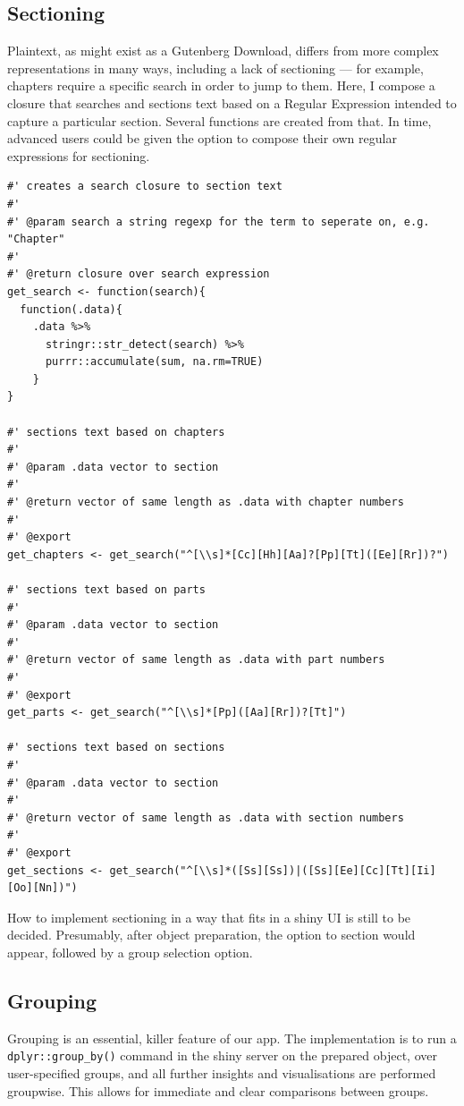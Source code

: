 \documentclass[11pt, a4paper, oneside]{report}
\begin{document}
\subsection{Sectioning}
\label{sec:orgb5ccf72}
Plaintext, as might exist as a Gutenberg Download, differs from more
complex representations in many ways, including a lack of sectioning
--- for example, chapters require a specific search in order to jump
to them. Here, I compose a closure that searches and sections text
based on a Regular Expression intended to capture a particular
section. Several functions are created from that. In time, advanced
users could be given the option to compose their own regular
expressions for sectioning.
\begin{verbatim}
#' creates a search closure to section text
#'
#' @param search a string regexp for the term to seperate on, e.g. "Chapter"
#'
#' @return closure over search expression 
get_search <- function(search){
  function(.data){
    .data %>%
      stringr::str_detect(search) %>%
      purrr::accumulate(sum, na.rm=TRUE)
    }
}

#' sections text based on chapters
#'
#' @param .data vector to section
#'
#' @return vector of same length as .data with chapter numbers
#'
#' @export
get_chapters <- get_search("^[\\s]*[Cc][Hh][Aa]?[Pp][Tt]([Ee][Rr])?")

#' sections text based on parts
#'
#' @param .data vector to section
#'
#' @return vector of same length as .data with part numbers
#'
#' @export
get_parts <- get_search("^[\\s]*[Pp]([Aa][Rr])?[Tt]")

#' sections text based on sections
#'
#' @param .data vector to section
#'
#' @return vector of same length as .data with section numbers
#'
#' @export
get_sections <- get_search("^[\\s]*([Ss][Ss])|([Ss][Ee][Cc][Tt][Ii][Oo][Nn])")
\end{verbatim}

How to implement sectioning in a way that fits in a shiny UI is still
to be decided. Presumably, after object preparation, the option to
section would appear, followed by a group selection option.

\subsection{Grouping}
\label{sec:orga051982}
Grouping is an essential, killer feature of our app. The
implementation is to run a \texttt{dplyr::group_by()} command
in the shiny server on the prepared object, over user-specified
groups, and all further insights and visualisations are performed
groupwise. This allows for immediate and clear comparisons between
groups.
\end{document}
